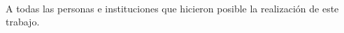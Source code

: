 \paragraph{}
A todas las personas e instituciones que hicieron posible la realizaci\'on de este trabajo.